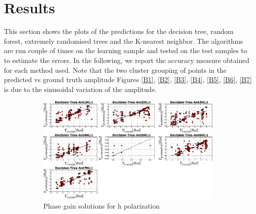 \section{Results}
\label{sec3}
This section shows the plots of the predictions for the decision tree, random forest, extremely randomised trees and the K-nearest neighbor. The algorithms are run couple of times on the learning sample and tested on the test samples to  to estimate the errors. In the following, we report the accuracy measure obtained for each method used. Note that the two cluster grouping of points in the predicted vs ground truth amplitude Figures \ref{B1}, \ref{B2}, \ref{B3}, \ref{B4}, \ref{B5}, \ref{B6}, \ref{B7} is due to the sinusoidal variation of the amplitude.
\begin{figure}[H]
   \centering
    \begin{subfigure}[t]{0.52\textheight}
        
        \includegraphics[width=\textwidth]{images/Decision-TreeHphase.eps} 
        \caption{Phase gain solutions for h polarization}
         \label{A}
    \end{subfigure}
    
      \begin{subfigure}[t]{0.52\textheight}
       

\end{subfigure}
\end{figure}
